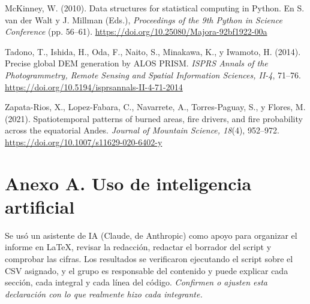 \documentclass[11pt,a4paper]{article}
\newcommand{\completar}[1]{\textit{\textcolor{gris}{#1}}}
\begin{document}
McKinney, W. (2010). Data structures for statistical computing in Python. En S. van der Walt y J. Millman (Eds.), \textit{Proceedings of the 9th Python in Science Conference} (pp. 56--61). \url{https://doi.org/10.25080/Majora-92bf1922-00a}

Tadono, T., Ishida, H., Oda, F., Naito, S., Minakawa, K., y Iwamoto, H. (2014). Precise global DEM generation by ALOS PRISM. \textit{ISPRS Annals of the Photogrammetry, Remote Sensing and Spatial Information Sciences, II-4}, 71--76. \url{https://doi.org/10.5194/isprsannals-II-4-71-2014}

Zapata-Rios, X., Lopez-Fabara, C., Navarrete, A., Torres-Paguay, S., y Flores, M. (2021). Spatiotemporal patterns of burned areas, fire drivers, and fire probability across the equatorial Andes. \textit{Journal of Mountain Science, 18}(4), 952--972. \url{https://doi.org/10.1007/s11629-020-6402-y}
\endgroup

\appendix


\section*{Anexo A. Uso de inteligencia artificial}
Se usó un asistente de IA (Claude, de Anthropic) como apoyo para organizar el informe en LaTeX, revisar la redacción, redactar el borrador del script y comprobar las cifras. Los resultados se verificaron ejecutando el script sobre el CSV asignado, y el grupo es responsable del contenido y puede explicar cada sección, cada integral y cada línea del código. \completar{Confirmen o ajusten esta declaración con lo que realmente hizo cada integrante.}
\end{document}
